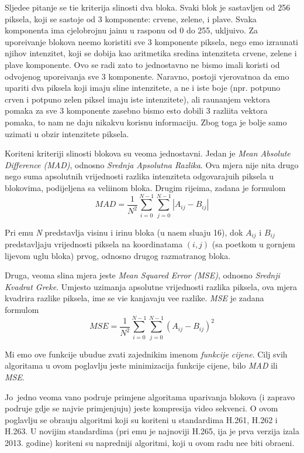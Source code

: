 Sljede\cj e pitanje se ti\ch e kriterija sli\ch nosti dva bloka. Svaki blok je sastavljen od 256 piksela, koji se sastoje od 3 komponente: crvene, zelene, i plave. Svaka komponenta ima cjelobrojnu ja\ch inu u rasponu od 0 do 255, uklju\ch ivo.
Za upore\dj ivanje blokova ne\cj emo koristiti sve 3 komponente piksela, nego \cj emo izra\ch unati njihov intenzitet, koji se dobija kao aritmeti\ch ka sredina intenziteta crvene, zelene i plave komponente. Ovo se radi zato \sh to 
jednostavno ne bismo imali koristi od odvojenog upore\dj ivanja sve 3 komponente.
Naravno, postoji vjerovatno\cj a da \cj emo upariti dva piksela koji imaju sli\ch ne intenzitete, a ne i iste boje (npr. potpuno crven i potpuno zelen piksel imaju iste intenzitete), ali ra\ch unanjem vektora pomaka za sve 3 komponente
zasebno bismo \ch esto dobili 3 razli\ch ita vektora pomaka, \sh to nam ne daju nikakvu korisnu informaciju. Zbog toga je bolje samo uzimati u obzir intenzitete piksela.

Kori\sh teni kriteriji sli\ch nosti blokova su veoma jednostavni. Jedan je  \textit{Mean Absolute Difference (MAD)}, odnosno \textit{Srednja Apsolutna Razlika}. Ova mjera nije ni\sh ta drugo nego suma apsolutnih vrijednosti razlika
intenziteta odgovaraju\cj ih piksela u blokovima, podijeljena sa veli\ch inom bloka. Drugim rije\ch ima, zadana je formulom
$$
MAD = \frac{1}{N^2}\sum_{i=0}^{N-1}\sum_{j=0}^{N-1}|A_{ij}-B_{ij}|
$$

Pri \ch emu \textit{N} predstavlja visinu i \sh irinu bloka (u na\sh em slu\ch aju 16), dok $A_{ij}$ i $B_{ij}$ predstavljaju vrijednosti piksela na koordinatama $(i,j)$ (sa po\ch etkom u gornjem lijevom uglu bloka) prvog,
odnosno drugog razmatranog bloka. 

Druga, veoma sli\ch na mjera jeste \textit{Mean Squared Error (MSE)}, odnosno \textit{Srednji Kvadrat Gre\sh ke}. Umjesto uzimanja apsolutne vrijednosti razlika piksela, ova mjera kvadrira razlike piksela, \ch ime se vi\sh e
ka\zh njavaju ve\cj e razlike. \textit{MSE} je zadana formulom
$$
MSE = \frac{1}{N^2}\sum_{i=0}^{N-1}\sum_{j=0}^{N-1}(A_{ij}-B_{ij})^2
$$

Mi \cj emo ove funkcije ubudu\cj e zvati zajedni\ch kim imenom \textit{funkcije cijene}. Cilj svih algoritama u ovom poglavlju jeste minimizacija funkcije cijene, bilo \textit{MAD} ili \textit{MSE}.

Jo\sh\ jedno veoma va\zh no podru\ch je primjene algoritama uparivanja blokova (i zapravo podru\ch je gdje se najvi\sh e primjenjuju) jeste kompresija video sekvenci. O ovom poglavlju se obra\dj uju
algoritmi koji su kori\sh teni u standardima H.261, H.262 i H.263. U novijim standardima (pri \ch emu je najnoviji H.265, \ch ija je prva verzija iza\sh la 2013. godine) kori\sh teni su napredniji algoritmi, koji u
ovom radu ne\cj e biti obra\dj eni.

